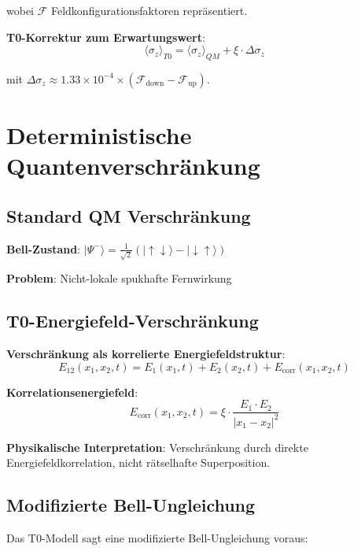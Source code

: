 \documentclass[12pt,a4paper]{article}
\newcommand{\Efield}{E}
\newcommand{\xipar}{\xi}
\begin{document}
	wobei $\mathcal{F}$ Feldkonfigurationsfaktoren repräsentiert.
	
	\textbf{T0-Korrektur zum Erwartungswert}:
	\begin{equation}
		\langle \sigma_z \rangle_{T0} = \langle \sigma_z \rangle_{QM} + \xipar \cdot \Delta\sigma_z
	\end{equation}
	
	mit $\Delta\sigma_z \approx 1.33 \times 10^{-4} \times (\mathcal{F}_{\text{down}} - \mathcal{F}_{\text{up}})$.
	
	\section{Deterministische Quantenverschränkung}
	
	\subsection{Standard QM Verschränkung}
	
	\textbf{Bell-Zustand}: $|\Psi^-\rangle = \frac{1}{\sqrt{2}}(|{\uparrow\downarrow}\rangle - |{\downarrow\uparrow}\rangle)$
	
	\textbf{Problem}: Nicht-lokale spukhafte Fernwirkung
	
	\subsection{T0-Energiefeld-Verschränkung}
	
	\textbf{Verschränkung als korrelierte Energiefeldstruktur}:
	\begin{equation}
		\boxed{\Efield_{12}(x_1, x_2, t) = \Efield_1(x_1, t) + \Efield_2(x_2, t) + \Efield_{\text{corr}}(x_1, x_2, t)}
	\end{equation}
	
	\textbf{Korrelationsenergiefeld}:
	\begin{equation}
		\Efield_{\text{corr}}(x_1, x_2, t) = \xipar \cdot \frac{\Efield_1 \cdot \Efield_2}{|x_1 - x_2|^2}
	\end{equation}
	
	\textbf{Physikalische Interpretation}: Verschränkung durch direkte Energiefeldkorrelation, nicht rätselhafte Superposition.
	
	\subsection{Modifizierte Bell-Ungleichung}
	
	Das T0-Modell sagt eine modifizierte Bell-Ungleichung voraus:
	
\end{document}
